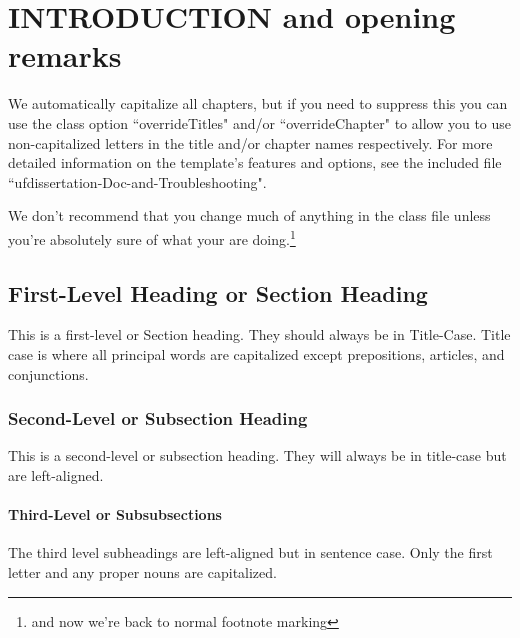\chapter{INTRODUCTION and opening remarks} {\renewcommand*{\thefootnote}{\fnsymbol{footnote}}\label{intro}
\renewcommand*{\thealgorithm}{\thechapter-\arabic{algorithm}} %

We automatically capitalize all chapters, but if you need to suppress this you can use the class option ``overrideTitles" and/or ``overrideChapter" to allow you to use non-capitalized letters in the title and/or chapter names respectively. For more detailed information on the template's features and options, see the included file ``ufdissertation-Doc-and-Troubleshooting".

 We don't recommend that you change much of anything in the class file unless you're absolutely sure of what your are doing.\renewcommand*{\thefootnote}{\arabic{footnote}}\setcounter{footnote}{0}\footnote{and now we're back to normal footnote marking} 

\section{First-Level Heading or Section Heading}

This is a first-level or Section heading. They should always be in Title-Case. Title case is where all principal words are capitalized except prepositions, articles, and conjunctions.  %

\subsection{Second-Level or Subsection Heading}

This is a second-level or subsection heading. They will always be in title-case but are left-aligned. 

\subsubsection{Third-Level or Subsubsections}
The third level subheadings are left-aligned but in sentence case. Only the first letter and any proper nouns are capitalized. 

}
